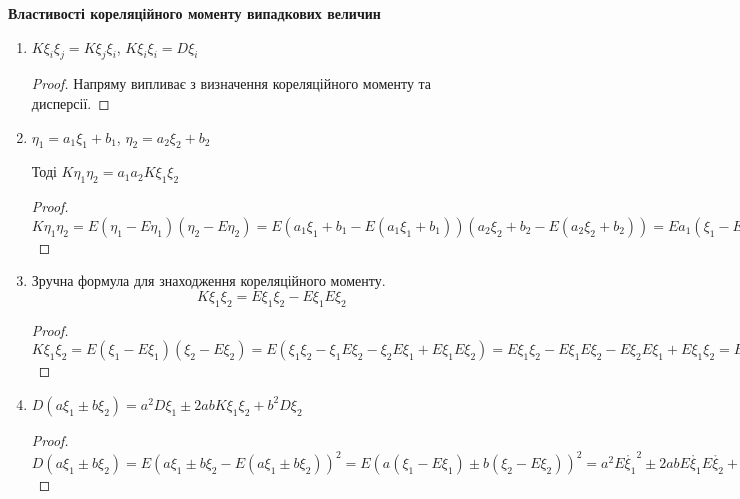 \noindent \textbf{Властивості кореляційного моменту випадкових 
величин}
\begin{enumerate}
    \item $K\xi_i\xi_j = K\xi_j\xi_i$, $K\xi_i\xi_i = D\xi_i$
    \begin{proof}
        Напряму випливає з визначення кореляційного моменту та дисперсії.
    \end{proof}
    \item $\eta_1 = a_1\xi_1 + b_1$, $\eta_2 = a_2\xi_2 + b_2$
    
    Тоді $K\eta_1\eta_2 = a_1a_2K\xi_1\xi_2$
    \begin{proof}
        $K\eta_1\eta_2 = E(\eta_1 - E\eta_1)(\eta_2 - E\eta_2) = 
        E(a_1\xi_1 + b_1 - E(a_1\xi_1 + b_1))
        (a_2\xi_2 + b_2 - E(a_2\xi_2 + b_2)) = 
        Ea_1(\xi_1 - E\xi_1)a_2(\xi_2 - E\xi_2) = 
        a_1a_2E(\xi_1 - E\xi_1)(\xi_2 - E\xi_2) = 
        a_1a_2K\xi_1\xi_2$
    \end{proof}

    \item Зручна формула для знаходження кореляційного моменту.
    \begin{equation*}
        K\xi_1\xi_2 = E\xi_1\xi_2 - E\xi_1 E\xi_2
    \end{equation*}
    \begin{proof}
        $K\xi_1\xi_2 = E(\xi_1 - E\xi_1)(\xi_2 - E\xi_2) = 
        E(\xi_1\xi_2 - \xi_1E\xi_2 - \xi_2E\xi_1 + E\xi_1E\xi_2) = 
        E\xi_1\xi_2 - E\xi_1E\xi_2 - E\xi_2E\xi_1 + E\xi_1\xi_2 = 
        E\xi_1\xi_2 - E\xi_1E\xi_2$
    \end{proof}
    
    \item $D(a\xi_1 \pm b\xi_2) = a^2D\xi_1 \pm 2abK\xi_1\xi_2 + 
    b^2D\xi_2$

    \begin{proof}
        $D(a\xi_1 \pm b\xi_2) = 
        E(a\xi_1 \pm b\xi_2 - E(a\xi_1 \pm b\xi_2))^2 =
        E(a(\xi_1-E\xi_1)\pm b(\xi_2 - E\xi_2))^2 = 
        a^2 E\mathring{\xi_1}^2 \pm 2abE\mathring{\xi_1}E\mathring{\xi_2} 
        + b^2 E\mathring{\xi_2}^2 = 
        a^2D\xi_1 \pm 2abK\xi_1\xi_2 + b^2D\xi_2$
    \end{proof}
\end{enumerate}